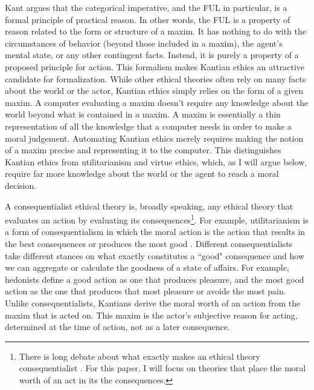 \begin{isabellebody}
\begin{isamarkuptext}
Kant argues that the categorical imperative, and the FUL in particular, is a formal principle of practical
reason. In other words, the FUL is a property of reason related to the form or structure of a maxim.
It has nothing to do with the circumstances of behavior (beyond those included in a maxim), the agent's
mental state, or any other contingent facts. Instead, it is purely a property of a proposed principle for
action. This formalism makes Kantian ethics an attractive candidate for formalization. While other 
ethical theories often rely on many facts about the world or the actor, Kantian ethics simply relies 
on the form of a given maxim. A computer evaluating a maxim doesn't require any knowledge about the 
world beyond what is contained in a maxim. A maxim is essentially a thin representation of all the knowledge
that a computer needs in order to make a moral judgement. Automating Kantian ethics merely requires 
making the notion of a maxim precise and representing it to the computer. This distinguishes Kantian 
ethics from utilitarianism and virtue ethics, which, as I will argue below, require far more knowledge
about the world or the agent to reach a moral decision.%
\end{isamarkuptext}\isamarkuptrue%
%
\isadelimdocument
%
\endisadelimdocument
%
\isatagdocument
%
\isamarkuptrue%
%
\endisatagdocument
{\isafolddocument}%
%
\isadelimdocument
%
\endisadelimdocument
%
\begin{isamarkuptext}%
A consequentialist ethical theory is, broadly speaking, any ethical theory that evaluates an action by evaluating 
its consequences\footnote{There is long debate about what exactly makes an ethical theory consequentialist \cite{consequentialismsep}. 
For this paper, I will focus on theories that place the moral worth of an act in its the consequences.}. For example, 
utilitarianism is a form of consequentialism in which the moral action 
is the action that results in the best consequences or produces the most good \cite{utilsep}. Different 
consequentialists take different stances on what exactly constitutes a ``good" consequence and how 
we can aggregate or calculate the goodness of a state of affairs. For example, hedonists define 
a good action as one that produces pleasure, and the most good action as the one that produces that most
pleasure or avoids the most pain. 
Unlike consequentialists, Kantians derive the moral worth of an action
from the maxim that is acted on. This maxim is the actor's subjective reason for acting, determined 
at the time of action, not as a later consequence.


\end{isamarkuptext}
\end{isabellebody}
